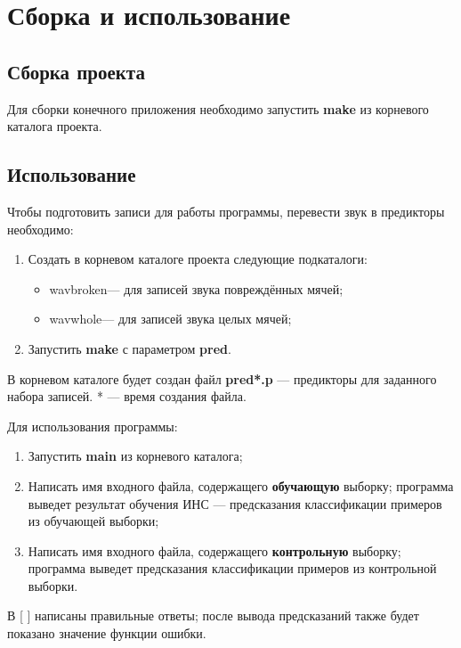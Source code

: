 \section{Сборка и использование}
\subsection{Сборка проекта}
	Для сборки конечного приложения необходимо запустить \textbf{make} из корневого каталога проекта.

\subsection{Использование}
	Чтобы подготовить записи для работы программы, перевести звук в предикторы необходимо:
	\begin{enumerate}
		\item Создать в корневом каталоге проекта следующие подкаталоги:
		\begin{itemize}
			\item \tbsh wav\tbsh broken\tbsh\qquad--- для записей звука повреждённых мячей;
			\item \tbsh wav\tbsh whole\tbsh\qquad--- для записей звука целых мячей;
		\end{itemize}
		\item Запустить \textbf{make} с параметром \textbf{pred}.
	\end{enumerate}
	В корневом каталоге будет создан файл \textbf{pred*.p} --- предикторы для заданного набора записей.
    * --- время создания файла.

	Для использования программы:
	\begin{enumerate}
		\item Запустить \textbf{main} из корневого каталога;
		\item Написать имя входного файла, содержащего \textbf{обучающую} выборку;
		программа выведет результат обучения ИНС --- предсказания классификации примеров из обучающей выборки;
		\item Написать имя входного файла, содержащего \textbf{контрольную} выборку;
		программа выведет предсказания классификации примеров из контрольной выборки.
	\end{enumerate}
	В [ ] написаны правильные ответы; после вывода предсказаний также будет показано значение функции ошибки.